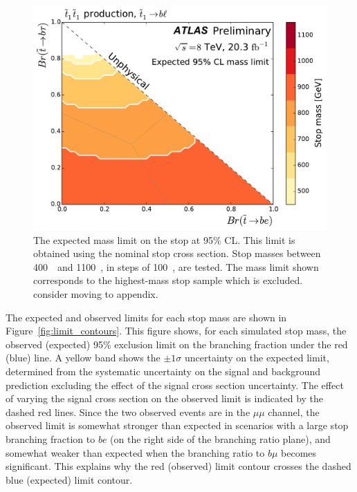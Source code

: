 \begin{figure}[ht]
  \centering
  \includegraphics[width=\textwidth]
    {figs/blstop/mass_limit_contours_no_extras_exp.pdf}
  \caption{The expected mass limit on the stop at 95\% CL.
    This limit is obtained using the nominal stop cross section.
    Stop masses between 400~\GeV\ and 1100~\GeV, in steps of 100~\GeV, are
    tested.
    The mass limit shown corresponds to the highest-mass stop sample which is
    excluded.
    {\color{red} consider moving to appendix.}
  }
  \label{fig:mass_limit_exp}
\end{figure}

The expected and observed limits for each stop mass are shown in
Figure~\ref{fig:limit_contours}.
This figure shows, for each simulated stop mass, the observed (expected)
95\% exclusion limit on the branching fraction under the red (blue) line.
A yellow band shows the $\pm 1\sigma$ uncertainty on the expected limit,
determined from the systematic uncertainty on the signal and background
prediction excluding the effect of the signal cross section uncertainty.
The effect of varying the signal cross section on the observed limit is
indicated by the dashed red lines.
Since the two observed events are in the $\mu\mu$ channel, the observed limit
is somewhat stronger than expected in scenarios with a large stop branching
fraction to $be$ (on the right side of the branching ratio plane), and somewhat
weaker than expected when the branching ratio to $b\mu$ becomes significant.
This explains why the red (observed) limit contour crosses the dashed
blue (expected) limit contour.

